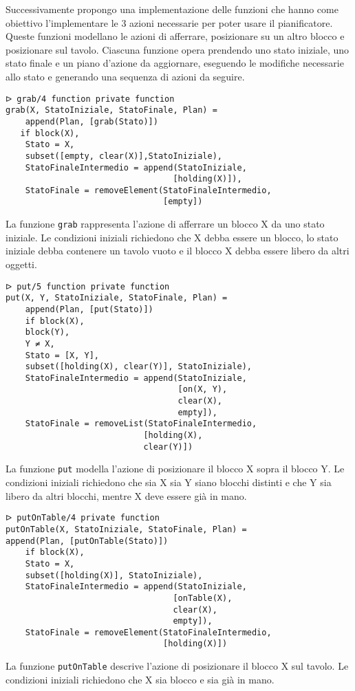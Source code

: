 \documentclass[12pt,twoside]{report}
\begin{document}
Successivamente propongo una implementazione delle funzioni che hanno come obiettivo  l'implementare le 3 azioni necessarie per poter usare il pianificatore. Queste funzioni modellano le azioni di afferrare, posizionare su un altro blocco e posizionare sul tavolo. Ciascuna funzione opera prendendo uno stato iniziale, uno stato finale e un piano d'azione da aggiornare, eseguendo le modifiche necessarie allo stato e generando una sequenza di azioni da seguire.
\begin{lstlisting}
ᐅ grab/4 function private function
grab(X, StatoIniziale, StatoFinale, Plan) = 
    append(Plan, [grab(Stato)])
   if block(X),
    Stato = X,
    subset([empty, clear(X)],StatoIniziale),
    StatoFinaleIntermedio = append(StatoIniziale, 
                                  [holding(X)]),
    StatoFinale = removeElement(StatoFinaleIntermedio, 
                                [empty])
\end{lstlisting}
La funzione \texttt{grab} rappresenta l'azione di afferrare un blocco X da uno stato iniziale. Le condizioni iniziali richiedono che X debba essere un blocco, lo stato iniziale debba contenere un tavolo vuoto e il blocco X debba essere libero da altri oggetti.
\begin{lstlisting}
ᐅ put/5 function private function
put(X, Y, StatoIniziale, StatoFinale, Plan) = 
    append(Plan, [put(Stato)])
    if block(X),
    block(Y),
    Y ≠ X,
    Stato = [X, Y],
    subset([holding(X), clear(Y)], StatoIniziale),
    StatoFinaleIntermedio = append(StatoIniziale, 
                                   [on(X, Y), 
                                   clear(X), 
                                   empty]),
    StatoFinale = removeList(StatoFinaleIntermedio, 
                            [holding(X), 
                            clear(Y)])
\end{lstlisting}
La funzione \texttt{put} modella l'azione di posizionare il blocco X sopra il blocco Y. Le condizioni iniziali richiedono che sia X sia Y siano blocchi distinti e che Y sia libero da altri blocchi, mentre X deve essere già in mano.
\begin{lstlisting}
ᐅ putOnTable/4 private function
putOnTable(X, StatoIniziale, StatoFinale, Plan) = 
append(Plan, [putOnTable(Stato)])
    if block(X),
    Stato = X,
    subset([holding(X)], StatoIniziale),
    StatoFinaleIntermedio = append(StatoIniziale, 
                                  [onTable(X), 
                                  clear(X), 
                                  empty]),
    StatoFinale = removeElement(StatoFinaleIntermedio, 
                                [holding(X)])
\end{lstlisting}
La funzione \texttt{putOnTable} descrive l'azione di posizionare il blocco X sul tavolo. Le condizioni iniziali richiedono che X sia blocco e sia già in mano.
\end{document}
